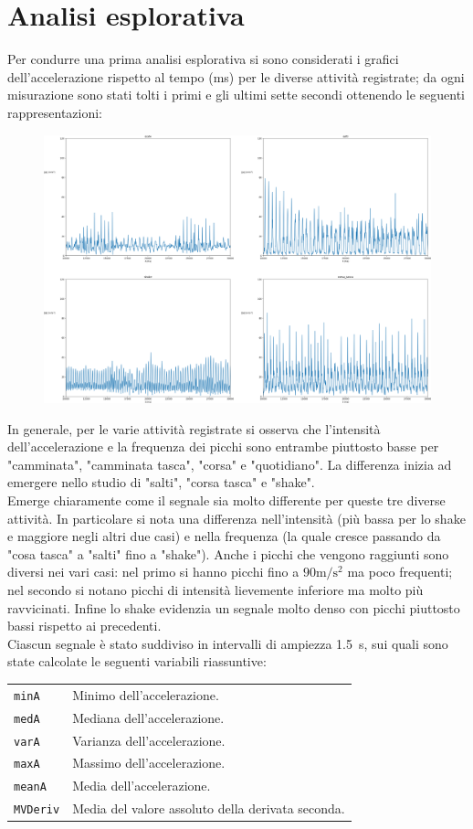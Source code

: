 \documentclass[./main.tex]{subfiles}
\begin{document}
\section{Analisi esplorativa}
Per condurre una prima analisi esplorativa si sono considerati i grafici dell'accelerazione rispetto al tempo (ms) per le diverse attività registrate; da ogni misurazione sono stati tolti i primi e gli ultimi sette secondi ottenendo le seguenti rappresentazioni:
\begin{figure}[H]
	\centering
	\includegraphics[width=.8\textwidth, keepaspectratio]{../../figure/espl.png}
	\caption{{}}
	\label{espl}
\end{figure}
In generale, per le varie attività registrate si osserva che l'intensità dell'accelerazione e la frequenza dei picchi sono entrambe piuttosto basse per "camminata", "camminata tasca", "corsa" e "quotidiano". La differenza inizia ad emergere nello studio di "salti", "corsa tasca" e "shake".\\
Emerge chiaramente come il segnale sia molto differente per queste tre diverse attività. In particolare si nota
una differenza nell'intensità (più bassa per lo shake e maggiore negli altri due casi) e nella frequenza (la quale cresce passando da "cosa tasca" a "salti" fino a "shake"). Anche i picchi che vengono raggiunti sono diversi nei vari casi: nel primo si hanno picchi fino a $90\si{\metre\per\square\second}$ ma poco frequenti; nel secondo si notano picchi di intensità lievemente inferiore ma molto più ravvicinati. Infine lo shake evidenzia un segnale molto denso con  picchi piuttosto bassi rispetto ai precedenti.\\
Ciascun segnale è stato suddiviso in intervalli di ampiezza \SI{1.5}{s}, sui quali sono state calcolate le seguenti variabili riassuntive:
\begin{table}[H]
	\begin{tabular}{ll}
		\texttt{minA}& Minimo dell'accelerazione.\\
		\texttt{medA}& Mediana dell'accelerazione.\\
		\texttt{varA}& Varianza dell'accelerazione.\\
		\texttt{maxA}& Massimo dell'accelerazione.\\
		\texttt{meanA}& Media dell'accelerazione.\\
		\texttt{MVDeriv}& Media del valore assoluto della derivata seconda.
	\end{tabular}
\end{table}
\end{document}
